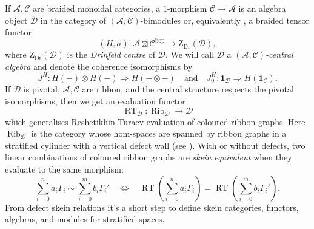 \documentclass[a4paper]{article}
\numberwithin{equation}{section}
\newcommand{\1}{{\mathrm{1}\mkern-4mu{\mathchoice{}{}{\mskip-0.5mu}{\mskip-1mu}}\mathrm{l}}}
\newcommand{\A}{\mathcal{A}}
\newcommand{\C}{\mathcal{C}}
\newcommand{\D}{\mathcal{D}}
\newcommand{\bop}{\text{bop}}
\newcommand{\Zdr}{\mathrm{Z}_{\text{Dr}}}
\DeclareMathOperator{\RT}{RT} %
\DeclareMathOperator{\Rib}{Rib}
\begin{document}
 If $\A,\C$ are braided monoidal categories, a $1$-morphism $\C \to \A$ is an algebra object $\D$ in the category of $(\A,\C)$-bimodules or, equivalently \cite[Def-Prop. 3.2]{BJS2021}, a braided tensor functor 
 \begin{equation}
     (H,\sigma): \A\boxtimes\C^{\bop} \to \Zdr(\D),
 \end{equation} where $\Zdr(\D)$ is the \emph{Drinfeld centre} of $\D$. We will call $\D$ a \emph{$(\A,\C)$-central algebra} and denote the coherence isomorphisms by 
 \begin{equation}
 J^H : H(-) \otimes H(-) \Rightarrow H(-\otimes -)\quad\text{and}\quad J_0^H\colon\boldsymbol{1}_\D\Rightarrow H(\boldsymbol{1}_\C).
 \end{equation}
If $\D$ is pivotal, $\A,\C$ are ribbon, and the central structure respects the pivotal isomorphisms, then we get an evaluation functor \cite[Def-Prop. 2.16]{Brown_Jordan_2025}
\begin{equation}
  \RT_\D : \Rib_\D \to \D
\end{equation}
which generalises Reshetikhin-Turaev evaluation of coloured ribbon graphs. Here $\Rib_\D$ is the category whose hom-spaces are spanned by ribbon graphs in a stratified cylinder with a vertical defect wall (see \cite[Definition 2.11]{Brown_Jordan_2025}). With or without defects, two linear combinations of coloured ribbon graphs are \emph{skein equivalent} when they evaluate to the same morphism:
\begin{equation}
  \sum_{i=0}^n a_i \Gamma_i \sim \sum_{i=0}^m b_i \Gamma_i' \quad \Leftrightarrow \quad \RT\left(\sum_{i=0}^n a_i \Gamma_i\right) = \RT\left(\sum_{i=0}^m b_i \Gamma_i'\right).
\end{equation}
From defect skein relations it's a short step to define skein categories, functors, algebras, and modules for stratified spaces.
\end{document}
